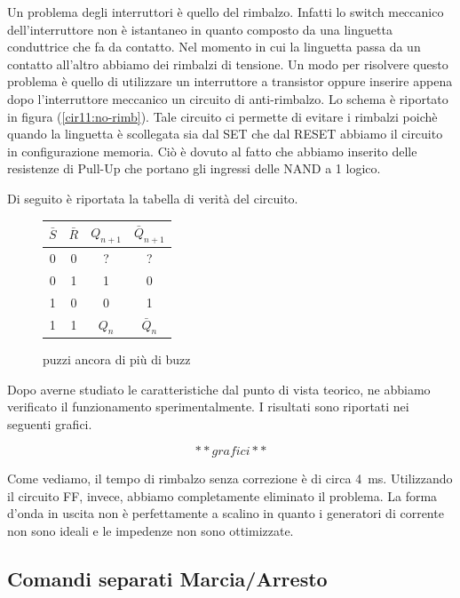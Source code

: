 Un problema degli interruttori è quello del rimbalzo. Infatti lo switch meccanico dell'interruttore non è istantaneo in quanto composto da una linguetta conduttrice che fa da contatto. Nel momento in cui la linguetta passa da un contatto all'altro abbiamo dei rimbalzi di tensione. Un modo per risolvere questo problema è quello di utilizzare un interruttore a transistor oppure inserire appena dopo l'interruttore meccanico un circuito di anti-rimbalzo. Lo schema è riportato in figura (\ref{cir11:no-rimb}). Tale circuito ci permette di evitare i rimbalzi poichè quando la linguetta è scollegata sia dal SET che dal RESET abbiamo il circuito in configurazione memoria. Ciò è dovuto al fatto che abbiamo inserito delle resistenze di Pull-Up che portano gli ingressi delle NAND a 1 logico. 

Di seguito è riportata la tabella di verità del circuito.




\begin{figure}[H]
		\centering
		{\renewcommand{\arraystretch}{1.1}%
		\begin{tabular}{c|c|c|c}
		$\bar S$ & $\bar R$ & $Q_{n+1}$ & $\bar Q_{n+1}$  \\
		\hline
		0 & 0  & ?&?\\
		\hline
		0&1 & 1 & 0\\
		\hline
		1&0 & 0  &1\\
		\hline
		1&1 & $Q_n$ & $\bar Q_n$\\
		\end{tabular}}
		\label{tab11:antirimb}
		\caption{puzzi ancora di più di buzz}
        \end{figure}


Dopo averne studiato le caratteristiche dal punto di vista teorico, ne abbiamo verificato il funzionamento sperimentalmente. I risultati sono riportati nei seguenti grafici.


$$**grafici**$$


Come vediamo, il tempo di rimbalzo senza correzione è di circa \SI{4}{\milli\second}. Utilizzando il circuito FF, invece, abbiamo completamente eliminato il problema. La forma d'onda in uscita non è perfettamente a scalino in quanto i generatori di corrente non sono ideali e le impedenze non sono ottimizzate. 


\subsection*{Comandi separati Marcia/Arresto}

